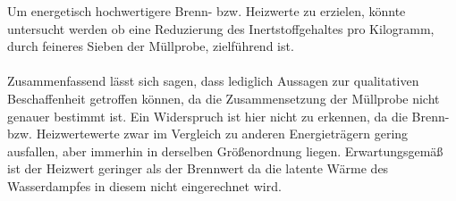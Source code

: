 \newpage
Um energetisch hochwertigere Brenn- bzw. Heizwerte zu erzielen, könnte untersucht werden ob eine Reduzierung des Inertstoffgehaltes pro Kilogramm, durch feineres Sieben der Müllprobe, zielführend ist.\\ \\
Zusammenfassend lässt sich sagen, dass lediglich Aussagen zur qualitativen Beschaffenheit getroffen können, da die Zusammensetzung der Müllprobe nicht genauer bestimmt ist. Ein Widerspruch ist hier nicht zu erkennen, da die Brenn- bzw. Heizwertewerte zwar im Vergleich zu anderen Energieträgern gering ausfallen, aber immerhin in derselben Größenordnung liegen.\linebreak
Erwartungsgemäß ist der Heizwert geringer als der Brennwert da die latente Wärme des Wasserdampfes in diesem nicht eingerechnet wird.\\


